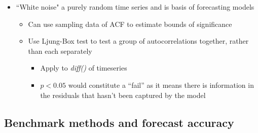 \documentclass{article}\usepackage[]{graphicx}\usepackage[]{color}
\begin{document}
\begin{itemize}
    \item ``White noise" a purely random time series and is basis of forecasting models
    \begin{itemize}
        \item Can use sampling data of ACF to estimate bounds of significance
        \item Use Ljung-Box test to test a group of autocorrelations together, rather than each separately
        \begin{itemize}
            \item Apply to \textit{diff()} of timeseries
            \item $p < 0.05$ would constitute a ``fail'' as it means there is information in the residuals that hasn't been captured by the model
        \end{itemize}
    \end{itemize}
\end{itemize}

\subsection{Benchmark methods and forecast accuracy}
\end{document}
